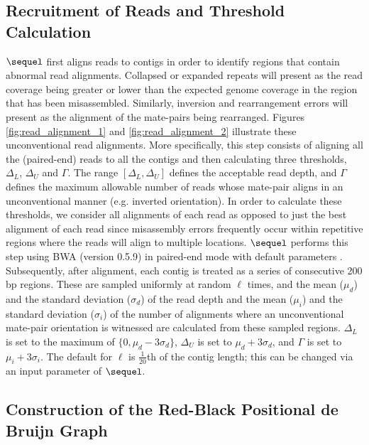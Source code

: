 \documentclass[doctor]{thesis}
\begin{document}
\subsection{Recruitment of Reads and Threshold Calculation}  

$\sequel$ first aligns reads to contigs in order to identify regions that contain abnormal read alignments.  
Collapsed or expanded repeats will present as the read coverage being greater or lower than the expected genome coverage in the region that has been misassembled.  Similarly, inversion and rearrangement errors will present as the alignment of the mate-pairs being rearranged. Figures \ref{fig:read_alignment_1} and \ref{fig:read_alignment_2} illustrate these unconventional read alignments. More specifically, this step consists of aligning all the (paired-end) reads to all the contigs and then calculating three thresholds, $\Delta_L$, $\Delta_U$ and $\Gamma$.  The range $[\Delta_L, \Delta_U]$ defines the acceptable read depth, and $\Gamma$ defines the maximum allowable number of reads whose mate-pair aligns in an unconventional manner (e.g. inverted orientation). 
In order to calculate these thresholds, we consider all alignments of each read as opposed to just the best alignment of each read since misassembly errors frequently occur within repetitive regions where the reads will align to multiple locations.  
$\sequel$ performs this step using BWA (version 0.5.9) in paired-end mode with default parameters \cite{bwa}.   Subsequently, after alignment, each contig is treated as a series of consecutive 200 bp regions.  These are sampled uniformly at random $\ell$ times, and the mean ($\mu_{d}$) and the standard deviation ($\sigma_d$) of the read depth and the mean ($\mu_{i}$) and the standard deviation ($\sigma_i$) of the number of alignments where an unconventional mate-pair orientation is witnessed are calculated from these sampled regions.   $\Delta_L$ is set to the maximum of $\{0, \mu_d - 3\sigma_d\}$, $\Delta_U$ is set to $\mu_d + 3\sigma_d$, and $\Gamma$ is set to $\mu_i + 3\sigma_i$.  The default for $\ell$ is $\frac{1}{20}$th of the contig length; this can be changed via an input parameter of $\sequel$.  



\subsection{Construction of the Red-Black Positional de Bruijn Graph} 
\end{document}
